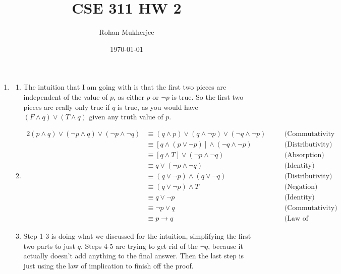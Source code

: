 \documentclass[12pt]{article}
\title{CSE 311 HW 2}
\date{\today}
\author{Rohan Mukherjee}
\theoremstyle{definition}
\theoremstyle{remark}
\newcommand{\justif}[1]{&\quad &\text{(#1)}}
\newcommand{\ra}{\rightarrow}
\begin{document}
	\maketitle
	\begin{enumerate}[leftmargin=\labelsep]
		\item 
		\begin{enumerate}
			\item The intuition that I am going with is that the first two pieces are independent of the value of $p$, as either $p$ or $\lnot p$ is true. So the first two pieces are really only true if $q$ is true, as you would have $(F \land q) \lor (T \land q)$ given any truth value of $p$. 
			\item 
			\begin{alignat*}{2}
				(p \land q) \lor (\lnot p \land q) \lor (\lnot p \land \lnot q) &\equiv (q \land p) \lor (q \land \lnot p) \lor (\lnot q \land \lnot p) \justif{Commutativity 3 times} \\
				&\equiv [q \land (p \lor \lnot p)] \land (\lnot q \land \lnot p) \justif{Distributivity} \\
				&\equiv [q \land T] \lor (\lnot p \land \lnot q) \justif{Absorption} \\
				&\equiv q \lor (\lnot p \land \lnot q) \justif{Identity} \\
				&\equiv (q \lor \lnot p) \land (q \lor \lnot q) \justif{Distributivity} \\
				&\equiv (q \lor \lnot p) \land T \justif{Negation} \\
				&\equiv q \lor \lnot p \justif{Identity} \\
				&\equiv \lnot p \lor q \justif{Commutativity} \\
				&\equiv p \ra q \justif{Law of implication}
			\end{alignat*}
			\item Step 1-3 is doing what we discussed for the intuition, simplifying the first two parts to just $q$. Steps 4-5 are trying to get rid of the $\lnot q$, because it actually doesn't add anything to the final answer. Then the last step is just using the law of implication to finish off the proof.
		\end{enumerate}
	

\end{enumerate}
\end{document}
